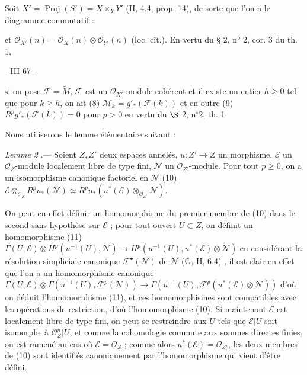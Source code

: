 Soit $X' = \operatorname{Proj}(S') = X \times_Y Y'$ (II, 4.4, prop. 14), de sorte que l'on a le diagramme commutatif :
et $\mathcal{O}_{X'}(n) = \mathcal{O}_X(n) \otimes \mathcal{O}_{Y'}(n)$ (loc. cit.). En vertu du § 2, n° 2, cor. 3 du th. 1,

\newpage


- III-67 -

si on pose $\mathcal{F}=\widetilde{M}$, $\mathcal{F}$ est un $\mathcal{O}_{X'}$-module cohérent et il existe un entier $h \geqslant 0$ tel que pour $k \geqslant h$, on ait
(8) $\mathcal{M}_k = g'_* (\mathcal{F}(k))$
et en outre
(9) $R^p g'_* (\mathcal{F}(k)) = 0$ pour $p > 0$
en vertu du $\S$ 2, n$^\circ$2, th. 1.

Nous utiliserons le lemme élémentaire suivant :

\emph{Lemme 2} .— Soient $Z, Z'$ deux espaces annelés, $u : Z' \to Z$ un morphisme, $\mathcal{E}$ un $\mathcal{O}_Z$-module localement libre de type fini, $\mathcal{N}$ un $\mathcal{O}_{Z'}$-module. Pour tout $p \geqslant 0$, on a un isomorphisme canonique factoriel en $\mathcal{N}$
(10) $\mathcal{E} \otimes_{\mathcal{O}_Z} R^p u_* (\mathcal{N}) \simeq R^p u_* (u^*(\mathcal{E}) \otimes_{\mathcal{O}_{Z'}} \mathcal{N})$.

On peut en effet définir un homomorphisme du premier membre de (10) dans le second sans hypothèse sur $\mathcal{E}$ ; pour tout ouvert $U \subset Z$, on définit un homomorphisme
(11) $\Gamma(U, \mathcal{E}) \otimes H^p(u^{-1}(U), \mathcal{N}) \to H^p(u^{-1}(U), u^*(\mathcal{E}) \otimes \mathcal{N})$
en considérant la résolution simpliciale canonique $\mathcal{F}^{\bullet}(\mathcal{N})$ de $\mathcal{N}$ (G, II, 6.4) ; il est clair en effet que l'on a un homomorphisme canonique
$\Gamma(U, \mathcal{E}) \otimes \Gamma(u^{-1}(U), \mathcal{F}^p(\mathcal{N})) \to \Gamma(u^{-1}(U), \mathcal{F}^p(u^*(\mathcal{E}) \otimes \mathcal{N}))$
d'où on déduit l'homomorphisme (11), et ces homomorphismes sont compatibles avec les opérations de restriction, d'où l'homomorphisme (10). Si maintenant $\mathcal{E}$ est localement libre de type fini, on peut se restreindre aux $U$ tels que $\mathcal{E}|U$ soit isomorphe à $\mathcal{O}_Z^n|U$, et comme la cohomologie commute aux sommes directes finies, on est ramené au cas où $\mathcal{E} = \mathcal{O}_Z$ ; comme alors $u^*(\mathcal{E}) = \mathcal{O}_{Z'}$, les deux membres de (10) sont identifiés canoniquement par l'homomorphisme qui vient d'être défini.

